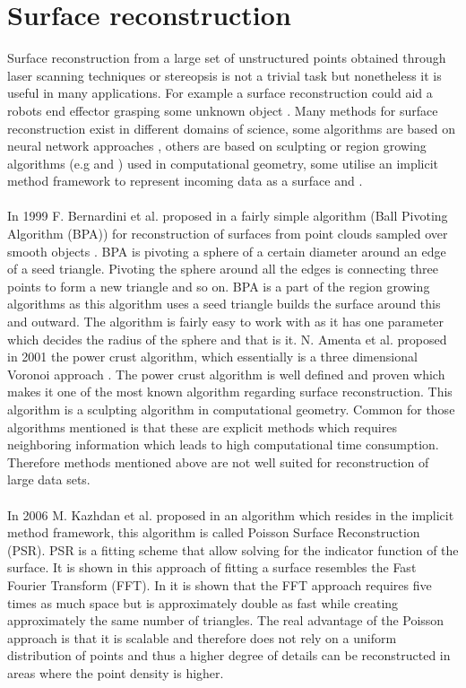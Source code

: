 \section{Surface reconstruction}
Surface reconstruction from a large set of unstructured points obtained through laser scanning techniques or stereopsis is not a trivial task but nonetheless it is useful in many applications. For example a surface reconstruction could aid a robots end effector grasping some unknown object \cite{Wang2005}. Many methods for surface reconstruction exist in different domains of science, some algorithms are based on neural network approaches  \cite{Wu2007}, others are based on sculpting or region growing algorithms (e.g \cite{Bernardini1999} and \cite{Amenta2001}) used in computational geometry, some utilise an implicit method framework to represent incoming data as a surface \cite{Kazhdan2006} and \cite{Dong2011}.\\
\\
In 1999 F. Bernardini et al. proposed in a fairly simple algorithm (Ball Pivoting Algorithm (BPA)) for reconstruction of surfaces from point clouds sampled over smooth objects \cite{Bernardini1999}. BPA is pivoting a sphere of a certain diameter around an edge of a seed triangle. Pivoting the sphere around all the edges is connecting three points to form a new triangle and so on. BPA is a part of the region growing algorithms as this algorithm uses a seed triangle builds the surface around this and outward. The algorithm is fairly easy to work with as it has one parameter which decides the radius of the sphere and that is it. N. Amenta et al. proposed in 2001 \cite{Amenta2001} the power crust algorithm, which essentially is a three dimensional Voronoi approach \cite{Ledoux2007}. The power crust algorithm is well defined and proven which makes it one of the most known algorithm regarding surface reconstruction. This algorithm is a sculpting algorithm in computational geometry. Common for those algorithms mentioned is that these are explicit methods which requires neighboring information which leads to high computational time consumption. Therefore methods mentioned above are not well suited for reconstruction of large data sets.\\
\\
In 2006 M. Kazhdan et al. proposed in \cite{Kazhdan2006} an algorithm which resides in the implicit method framework, this algorithm is called Poisson Surface Reconstruction (PSR). PSR is a fitting scheme that allow solving for the indicator function of the surface. It is shown in \cite{Kazhdan2006} this approach of fitting a surface resembles the Fast Fourier Transform (FFT). In \cite{Kazhdan2006} it is shown that the FFT approach requires five times as much space but is approximately double as fast while creating approximately the same number of triangles. The real advantage of the Poisson approach is that it is scalable and therefore does not rely on a uniform distribution of points and thus a higher degree of details can be reconstructed in areas where the point density is higher.\\
